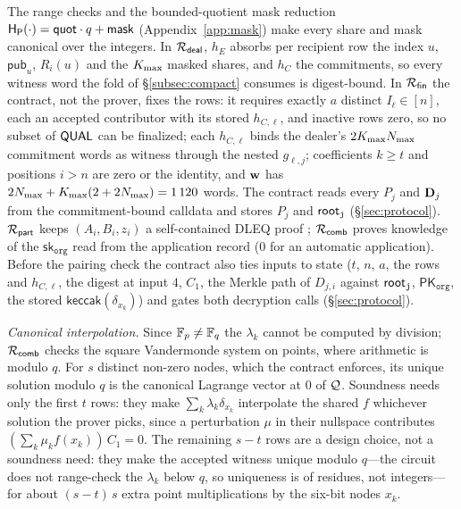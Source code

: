 The range checks and the bounded-quotient mask reduction $\mathsf{H}_{\mathsf{P}}(\cdot) = \mathsf{quot}\cdot q + \mathsf{mask}$ (Appendix~\ref{app:mask}) make every share and mask canonical over the integers. In $\mathcal{R}_{\mathsf{deal}}$, $h_E$ absorbs per recipient row the index $u$, $\mathsf{pub}_u$, $R_i(u)$ and the $K_{\max}$ masked shares, and $h_C$ the commitments, so every witness word the fold of \S\ref{subsec:compact} consumes is digest-bound. In $\mathcal{R}_{\mathsf{fin}}$ the contract, not the prover, fixes the rows: it requires exactly $a$ distinct $I_\ell \in [n]$, each an accepted contributor with its stored $h_{C,\ell}$, and inactive rows zero, so no subset of $\mathsf{QUAL}$ can be finalized; each $h_{C,\ell}$ binds the dealer's $2K_{\max}N_{\max}$ commitment words as witness through the nested $g_{\ell,j}$; coefficients $k \ge t$ and positions $i > n$ are zero or the identity, and $\mathbf{w}$ has $2N_{\max} + K_{\max}(2+2N_{\max}) = 1\,120$ words. The contract reads every $P_j$ and $\mathbf{D}_j$ from the commitment-bound calldata and stores $P_j$ and $\mathsf{root}_{\mathtt{j}}$ (\S\ref{sec:protocol}). $\mathcal{R}_{\mathsf{part}}$ keeps $(A_i, B_i, z_i)$ a self-contained DLEQ proof \cite{chaum1992wallet}; $\mathcal{R}_{\mathsf{comb}}$ proves knowledge of the $\mathsf{sk}_{\mathtt{org}}$ read from the application record ($0$ for an automatic application). Before the pairing check the contract also ties inputs to state ($t$, $n$, $a$, the rows and $h_{C,\ell}$, the digest at input $4$, $C_1$, the Merkle path of $D_{j,i}$ against $\mathsf{root}_{\mathtt{j}}$, $\mathsf{PK}_{\mathtt{org}}$, the stored $\mathsf{keccak}(\delta_{x_k})$) and gates both decryption calls (\S\ref{sec:protocol}).

\emph{Canonical interpolation.} Since $\mathbb{F}_p \ne \mathbb{F}_q$ the $\lambda_k$ cannot be computed by division; $\mathcal{R}_{\mathsf{comb}}$ checks the square Vandermonde system on points, where arithmetic is modulo $q$. For $s$ distinct non-zero nodes, which the contract enforces, its unique solution modulo $q$ is the canonical Lagrange vector at $0$ of $\mathcal{Q}$. Soundness needs only the first $t$ rows: they make $\sum_k \lambda_k\delta_{x_k}$ interpolate the shared $f$ whichever solution the prover picks, since a perturbation $\mu$ in their nullspace contributes $(\sum_k \mu_k f(x_k))\,C_1 = 0$. The remaining $s-t$ rows are a design choice, not a soundness need: they make the accepted witness unique modulo $q$---the circuit does not range-check the $\lambda_k$ below $q$, so uniqueness is of residues, not integers---for about $(s-t)\,s$ extra point multiplications by the six-bit nodes $x_k$.

